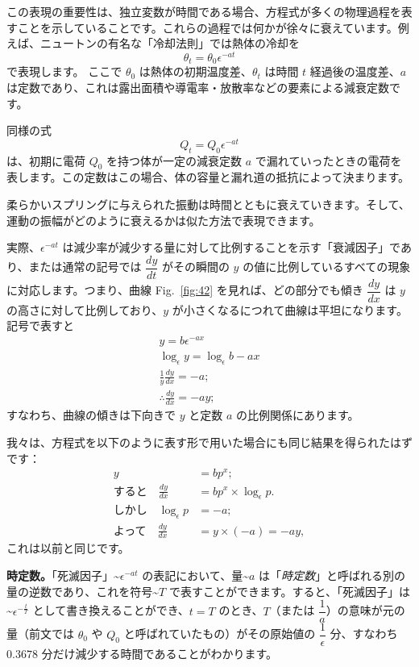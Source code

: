 \documentclass[a4paper,11pt,openany]{ltjsbook}
\newcommand{\Fig}[1]{Fig.~\ref{fig:#1}}
\begin{document}
\begin{enumerate}
この表現の重要性は、独立変数が時間である場合、方程式が多くの物理過程を表すことを示していることです。これらの過程では何かが徐々に衰えています。例えば、ニュートンの有名な「冷却法則」では熱体の冷却を
\[
\theta_t = \theta_0 \epsilon^{-at}
\]
で表現します。
ここで $\theta_0$ は熱体の初期温度差、$\theta_t$ は時間 $t$ 経過後の温度差、$a$ は定数であり、これは露出面積や導電率・放散率などの要素による減衰定数です。

同様の式
\[
Q_t = Q_0 \epsilon^{-at}
\]
は、初期に電荷 $Q_0$ を持つ体が一定の減衰定数 $a$ で漏れていったときの電荷を表します。この定数はこの場合、体の容量と漏れ道の抵抗によって決まります。

柔らかいスプリングに与えられた振動は時間とともに衰えていきます。そして、運動の振幅がどのように衰えるかは似た方法で表現できます。

実際、$\epsilon^{-at}$ は減少率が減少する量に対して比例することを示す「衰減因子」であり、または通常の記号では $\dfrac{dy}{dt}$ がその瞬間の $y$ の値に比例しているすべての現象に対応します。つまり、曲線 \Fig{42} を見れば、どの部分でも傾き $\dfrac{dy}{dx}$ は $y$ の高さに対して比例しており、$y$ が小さくなるにつれて曲線は平坦になります。記号で表すと
\begin{gather*}
y = b\epsilon^{-ax}\\
\log_\epsilon y = \log_\epsilon b - ax\\
\frac{1}{y} \frac{dy}{dx} = -a;\\
\therefore \frac{dy}{dx} = -ay;
\end{gather*}
すなわち、曲線の傾きは下向きで $y$ と定数 $a$ の比例関係にあります。

我々は、方程式を以下のように表す形で用いた場合にも同じ結果を得られたはずです：
\begin{align*}
y &= bp^x; \\
\text{すると} \quad \frac{dy}{dx} &= bp^x \times  \log_\epsilon p. \\
\text{しかし} \quad \log_\epsilon p &= -a; \\
\text{よって} \quad \frac{dy}{dx} &= y \times  (-a) = -ay,
\end{align*}
これは以前と同じです。

\par\medskip\noindent\textbf{時定数。}「死滅因子」\textasciitilde{}$\epsilon^{-at}$ の表記において、量\textasciitilde{}$a$ は「\emph{時定数}」と呼ばれる別の量の逆数であり、これを符号\textasciitilde{}$T$ で表すことができます。すると、「死滅因子」は\textasciitilde{}$\epsilon^{-\frac{t}{T}}$ として書き換えることができ、$t = T$ のとき、$T$（または $\dfrac{1}{a}$）の意味が元の量（前文では $\theta_0$ や $Q_0$ と呼ばれていたもの）がその原始値の $\dfrac{1}{\epsilon}$ 分、すなわち $0.3678$ 分だけ減少する時間であることがわかります。


\end{enumerate}
\end{document}
